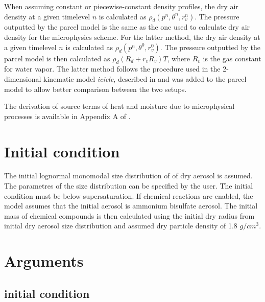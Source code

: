 \documentclass[11pt]{article}
\begin{document}
When assuming constant or piecewise-constant density profiles, 
  the dry air density at a given timelevel $n$ 
  is calculated as $\rho_d(p^n, \theta^n, r_v^n)$. 
The pressure outputted by the parcel model is the same as the one used to calculate dry air density for the microphysics scheme.
For the latter method, the dry air density at a given timelevel $n$ is calculated as $\rho_d(p^n, \theta^0, r_v^0)$.
The pressure outputted by the parcel model is then calculated as $ \rho_d  (R_d + r_v R_v)  T$, 
  where $R_v$ is the gas constant for water vapor.
The latter method follows the procedure used in the 2-dimensional kinematic model \emph{icicle}, 
  described in \citep{Arabas_et_al_2015} and was added to the parcel model to allow better comparison 
  between the two setups.

The derivation of source terms of heat and moisture due to microphysical processes 
  is available in Appendix A of \citep{Arabas_et_al_2015}.


\section{Initial condition}

The initial lognormal monomodal size distribution of of dry aerosol is assumed. 
The parametres of the size distribution can be specified by the user.
The initial condition must be below supersaturation.
If chemical reactions are enabled, the model assumes that the initial aerosol is ammonium bisulfate aerosol.
The initial mass of chemical compounds is then calculated using the initial dry radius from initial 
  dry aerosol size distribution and assumed dry particle density of 1.8 $g/cm^3$.

\section{Arguments}

\subsection{initial condition}
\end{document}
